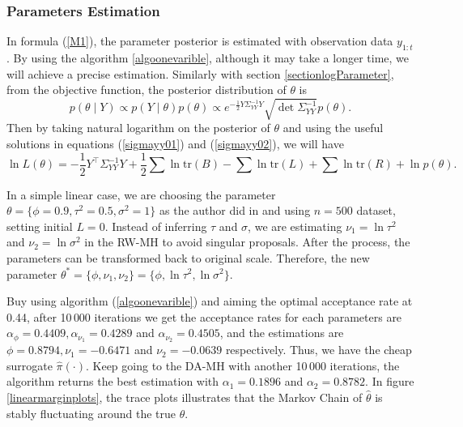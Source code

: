 \subsubsection*{Parameters Estimation}

In formula (\ref{M1}), the parameter posterior is estimated with observation data $y_{1:t}$. By using the algorithm \ref{algoonevarible}, although it may take a longer time, we will achieve a precise estimation. Similarly with section \ref{sectionlogParameter}, from the objective function, the posterior distribution of $\theta$ is 
\begin{equation*}
p(\theta \mid Y) \propto p(Y\mid\theta)p(\theta) \propto e^{-\frac{1}{2} Y \Sigma_{YY}^{-1} Y } \sqrt{\det \Sigma_{YY}^{-1}} p(\theta).
\end{equation*}
Then by taking natural logarithm on the posterior of $\theta$ and using the useful solutions in equations (\ref{sigmayy01}) and (\ref{sigmayy02}), we will have
\begin{equation}\label{linearlogL}
\ln L(\theta) = -\frac{1}{2}Y^\top\Sigma_{YY}^{-1}Y+\frac{1}{2}\sum\ln\mbox{tr}(B)-\sum\ln\mbox{tr}(L)+\sum\ln\mbox{tr}(R) + \ln p(\theta).
\end{equation}

In a simple linear case, we are choosing the parameter $\theta = \{\phi=0.9,\tau^2=0.5,\sigma^2=1\}$ as the author did in \cite{lopes2011particle} and using $n=500$ dataset, setting initial $L=0$. Instead of inferring $\tau$ and $\sigma$, we are estimating $\nu_1 = \ln \tau^2$ and $\nu_2 = \ln \sigma^2$ in the RW-MH to avoid singular proposals. After the process, the parameters can be transformed back to original scale. Therefore, the new parameter  $\theta^* =  \{\phi,\nu_1,\nu_2\} = \{\phi,\ln\tau^2,\ln\sigma^2\}$. 

Buy using algorithm (\ref{algoonevarible}) and aiming the optimal acceptance rate at 0.44, after 10\,000 iterations we get the acceptance rates for each parameters are $\alpha_\phi = 0.4409, \alpha_{\nu_1}= 0.4289$ and $\alpha_{\nu_2}= 0.4505$, and the estimations are $\phi =0.8794, \nu_1= -0.6471$ and $\nu_2= -0.0639$ respectively. Thus, we have the cheap surrogate $\hat{\pi}(\cdot)$. Keep going to the DA-MH with another 10\,000 iterations, the algorithm returns the best estimation with $\alpha_1=0.1896$ and $\alpha_2 = 0.8782$. In figure \ref{linearmarginplots}, the trace plots illustrates that the Markov Chain of $\hat{\theta}$ is stably fluctuating around the true $\theta$. 

